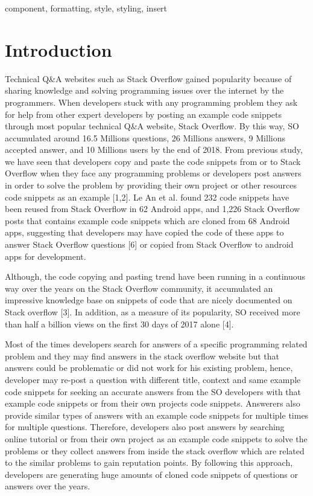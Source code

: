 \documentclass[conference]{IEEEtran}
\begin{document}
	\begin{IEEEkeywords}
		component, formatting, style, styling, insert
	\end{IEEEkeywords}
	
	\section{Introduction} \label{intro}
	Technical Q\&A websites such as Stack Overflow  gained popularity because of sharing knowledge and solving programming issues over the internet by the programmers. When developers stuck with any programming problem they ask for help from other expert developers by posting an example code snippets through most popular technical Q\&A website, Stack Overflow. By this way, SO accumulated around 16.5 Millions questions, 26 Millions answers, 9 Millions accepted answer, and 10 Millions users by the end of 2018. 
	From previous study, we have seen that developers copy and paste the code snippets from or to Stack Overflow when they face any programming problems or developers post answers in order to solve the problem by providing their own project or other resources code snippets as an example [1,2]. Le An et al. found 232 code snippets have been reused from Stack Overflow in 62 Android apps, and 1,226 Stack Overflow posts that contains example code snippets which are cloned from 68 Android apps, suggesting that developers may have copied the code of these apps to answer Stack Overflow questions [6] or copied from Stack Overflow to android apps for development.
	
	Although, the code copying and pasting trend have been running in a continuous way over the years on the Stack Overflow community, it accumulated an impressive knowledge base on snippets of code that are nicely documented on Stack overflow [3]. In addition, as a measure of its popularity, SO received more than half a billion views on the first 30 days of 2017 alone [4]. 
	
	Most of the times developers search for answers of a specific programming related problem and they may find answers in the stack overflow website but that answers could be problematic or did not work for his existing problem, hence, developer may re-post a question with different title, context and same example code snippets for seeking an accurate answers from the SO developers with that example code snippets or from their own projects code snippets. Answerers also provide similar types of answers with an example code snippets for multiple times for multiple questions. Therefore, developers also post answers by searching online tutorial or from their own project as an example code snippets to solve the problems or they collect answers from inside the stack overflow which are related to the similar problems to gain reputation points. By following this approach, developers are generating huge amounts of cloned code snippets of questions or answers over the years. 
	
\end{document}

